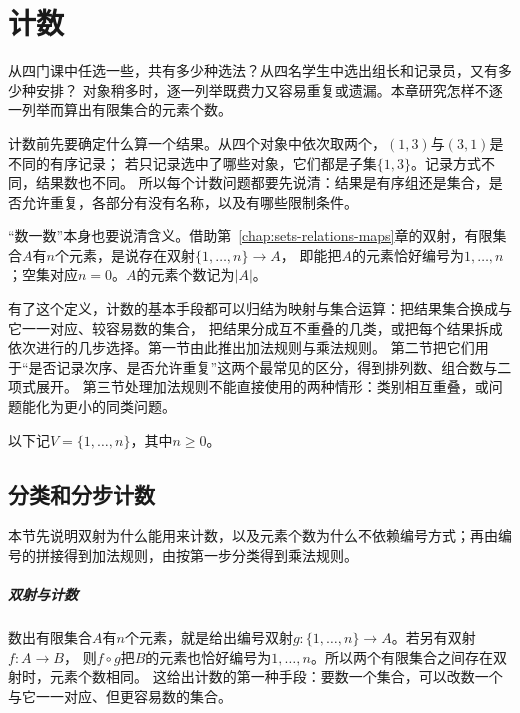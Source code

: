 \chapter{计数}
\label{chap:combinatorics}
\label{chap:counting}

从四门课中任选一些，共有多少种选法？从四名学生中选出组长和记录员，又有多少种安排？
对象稍多时，逐一列举既费力又容易重复或遗漏。本章研究怎样不逐一列举而算出有限集合的元素个数。

计数前先要确定什么算一个结果。从四个对象中依次取两个，$(1,3)$与$(3,1)$是不同的有序记录；
若只记录选中了哪些对象，它们都是子集$\{1,3\}$。记录方式不同，结果数也不同。
所以每个计数问题都要先说清：结果是有序组还是集合，是否允许重复，各部分有没有名称，以及有哪些限制条件。

“数一数”本身也要说清含义。借助第~\ref{chap:sets-relations-maps}章的双射，有限集合$A$有$n$个元素，是说存在双射$\{1,\ldots,n\}\to A$，
即能把$A$的元素恰好编号为$1,\ldots,n$；空集对应$n=0$。$A$的元素个数记为$|A|$。

有了这个定义，计数的基本手段都可以归结为映射与集合运算：把结果集合换成与它一一对应、较容易数的集合，
把结果分成互不重叠的几类，或把每个结果拆成依次进行的几步选择。第一节由此推出加法规则与乘法规则。
第二节把它们用于“是否记录次序、是否允许重复”这两个最常见的区分，得到排列数、组合数与二项式展开。
第三节处理加法规则不能直接使用的两种情形：类别相互重叠，或问题能化为更小的同类问题。

以下记$V=\{1,\ldots,n\}$，其中$n\geq0$。

\section{分类和分步计数}
\label{sec:comb-families-counting}
\label{sec:comb-finite-counting}
\label{sec:comb-decomposition-counting}
\label{sec:comb-classification-products}
\label{sec:comb-classification-counting}

本节先说明双射为什么能用来计数，以及元素个数为什么不依赖编号方式；再由编号的拼接得到加法规则，由按第一步分类得到乘法规则。

\paragraph{双射与计数}
数出有限集合$A$有$n$个元素，就是给出编号双射$g:\{1,\ldots,n\}\to A$。若另有双射$f:A\to B$，
则$f\circ g$把$B$的元素也恰好编号为$1,\ldots,n$。所以两个有限集合之间存在双射时，元素个数相同。
这给出计数的第一种手段：要数一个集合，可以改数一个与它一一对应、但更容易数的集合。

